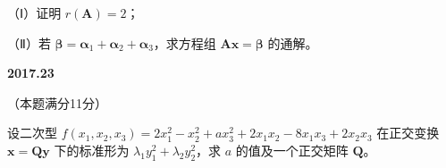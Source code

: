 \documentclass[UTF8,12pt,fontset=windows]{ctexart}
\begin{document}
（Ⅰ）证明 $r(\boldsymbol{A}) = 2$；

（Ⅱ）若 $\boldsymbol{\beta} = \boldsymbol{\alpha}_1 + \boldsymbol{\alpha}_2 + \boldsymbol{\alpha}_3$，求方程组 $\boldsymbol{A}\boldsymbol{x} = \boldsymbol{\beta}$ 的通解。

\vfill
\newpage
{\large\bfseries 2017.23}

（本题满分11分）

设二次型 $f(x_1, x_2, x_3) = 2x_1^2 - x_2^2 + ax_3^2 + 2x_1x_2 - 8x_1x_3 + 2x_2x_3$ 在正交变换 $\boldsymbol{x} = \boldsymbol{Q}\boldsymbol{y}$ 下的标准形为 $\lambda_1 y_1^2 + \lambda_2 y_2^2$，求 $a$ 的值及一个正交矩阵 $\boldsymbol{Q}$。

\vfill
\end{document}
